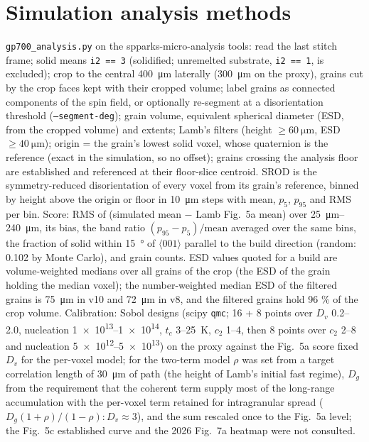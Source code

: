\documentclass[11pt,a4paper]{article}
\newcommand{\code}[1]{\texttt{#1}}
\newcommand{\dir}[1]{$\langle #1 \rangle$}
\begin{document}
\section{Simulation analysis methods}
\code{gp700\_analysis.py} on the spparks-micro-analysis tools: read the last stitch frame; solid means \code{i2 == 3} (solidified; unremelted substrate, \code{i2 == 1}, is excluded); crop to the central \SI{400}{\micro\metre} laterally (\SI{300}{\micro\metre} on the proxy), grains cut by the crop faces kept with their cropped volume; label grains as connected components of the spin field, or optionally re-segment at a disorientation threshold (\code{--segment-deg}); grain volume, equivalent spherical diameter (ESD, from the cropped volume) and extents; Lamb's filters (height $\geq \SI{60}{\micro\metre}$, ESD $\geq \SI{40}{\micro\metre}$); origin = the grain's lowest solid voxel, whose quaternion is the reference (exact in the simulation, so no offset); grains crossing the analysis floor are established and referenced at their floor-slice centroid. SROD is the symmetry-reduced disorientation of every voxel from its grain's reference, binned by height above the origin or floor in \SI{10}{\micro\metre} steps with mean, $p_5$, $p_{95}$ and RMS per bin. Score: RMS of (simulated mean $-$ Lamb Fig.~5a mean) over \SIrange{25}{240}{\micro\metre}, its bias, the band ratio $(p_{95}-p_5)/\text{mean}$ averaged over the same bins, the fraction of solid within \SI{15}{\degree} of \dir{001} parallel to the build direction (random: 0.102 by Monte Carlo), and grain counts. ESD values quoted for a build are volume-weighted medians over all grains of the crop (the ESD of the grain holding the median voxel); the number-weighted median ESD of the filtered grains is \SI{75}{\micro\metre} in v10 and \SI{72}{\micro\metre} in v8, and the filtered grains hold 96 \% of the crop volume. Calibration: Sobol designs (scipy \code{qmc}; 16 + 8 points over $D_v$ 0.2--2.0, nucleation \numrange{1e13}{1e14}, $t_c$ 3--\SI{25}{\kelvin}, $c_2$ 1--4, then 8 points over $c_2$ 2--8 and nucleation \numrange{5e12}{5e13}) on the proxy against the Fig.~5a score fixed $D_v$ for the per-voxel model; for the two-term model $\rho$ was set from a target correlation length of \SI{30}{\micro\metre} of path (the height of Lamb's initial fast regime), $D_g$ from the requirement that the coherent term supply most of the long-range accumulation with the per-voxel term retained for intragranular spread ($D_g (1+\rho)/(1-\rho) : D_v \approx 3$), and the sum rescaled once to the Fig.~5a level; the Fig.~5c established curve and the 2026 Fig.~7a heatmap were not consulted.
\end{document}
